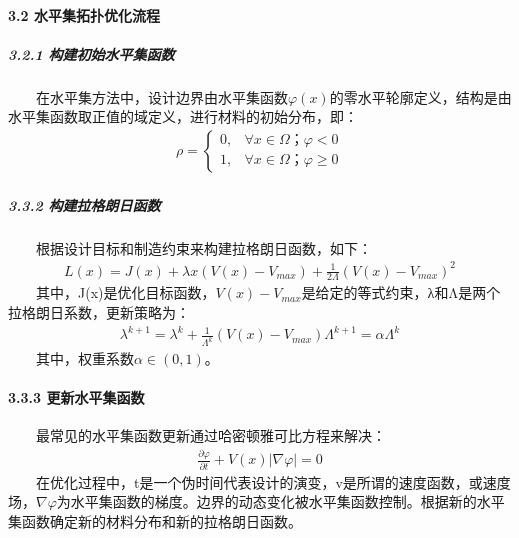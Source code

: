 \documentclass[a4paper,10pt,english]{sphinxmanual}
\begin{document}
\paragraph{3.2 水平集拓扑优化流程}
\label{\detokenize{_u7b80_u4ecb/_u6838_u5fc3_u8bbe_u8ba1_u4f18_u5316_u7b97_u6cd5/_u68af_u5ea6_u62d3_u6251_u4f18_u5316_u6a21_u5757/_u68af_u5ea6_u62d3_u6251_u4f18_u5316_u7b97_u6cd5:id10}}

\subparagraph{3.2.1 构建初始水平集函数}
\label{\detokenize{_u7b80_u4ecb/_u6838_u5fc3_u8bbe_u8ba1_u4f18_u5316_u7b97_u6cd5/_u68af_u5ea6_u62d3_u6251_u4f18_u5316_u6a21_u5757/_u68af_u5ea6_u62d3_u6251_u4f18_u5316_u7b97_u6cd5:id11}}
\sphinxAtStartPar
  在水平集方法中，设计边界由水平集函数\(φ(x)\)的零水平轮廓定义，结构是由水平集函数取正值的域定义，进行材料的初始分布，即：
\begin{equation*}
\begin{split}     ρ=\begin{cases}0,& ∀x∈Ω；φ<0 \\ 1,& ∀x∈Ω；φ≥0 \end{cases}\end{split}
\end{equation*}

\subparagraph{3.3.2 构建拉格朗日函数}
\label{\detokenize{_u7b80_u4ecb/_u6838_u5fc3_u8bbe_u8ba1_u4f18_u5316_u7b97_u6cd5/_u68af_u5ea6_u62d3_u6251_u4f18_u5316_u6a21_u5757/_u68af_u5ea6_u62d3_u6251_u4f18_u5316_u7b97_u6cd5:id12}}
\sphinxAtStartPar
  根据设计目标和制造约束来构建拉格朗日函数，如下：
\begin{equation*}
\begin{split}    L(x)=J(x)+λx(V(x)-V_{max}) +\frac{1}{2Λ}(V(x)-V_{max})^2\end{split}
\end{equation*}
\sphinxAtStartPar
  其中，J(x)是优化目标函数，\(V(x)-V_{max}\)是给定的等式约束，λ和Λ是两个拉格朗日系数，更新策略为：
\begin{equation*}
\begin{split}    λ^{k+1}=λ^{k}+\frac{1}{Λ^k}(V(x)-V_{max})Λ^{k+1}=αΛ^k\end{split}
\end{equation*}
\sphinxAtStartPar
  其中，权重系数\(α∈(0,1)\)。


\paragraph{3.3.3 更新水平集函数}
\label{\detokenize{_u7b80_u4ecb/_u6838_u5fc3_u8bbe_u8ba1_u4f18_u5316_u7b97_u6cd5/_u68af_u5ea6_u62d3_u6251_u4f18_u5316_u6a21_u5757/_u68af_u5ea6_u62d3_u6251_u4f18_u5316_u7b97_u6cd5:id13}}
\sphinxAtStartPar
  最常见的水平集函数更新通过哈密顿\sphinxhyphen{}雅可比方程来解决：
\begin{equation*}
\begin{split}    \frac{\partial φ}{\partial t}+V(x)|\nabla φ| =0\end{split}
\end{equation*}
\sphinxAtStartPar
  在优化过程中，t是一个伪时间代表设计的演变，v是所谓的速度函数，或速度场，\(\nabla φ\)为水平集函数的梯度。边界的动态变化被水平集函数控制。根据新的水平集函数确定新的材料分布和新的拉格朗日函数。
\end{document}
